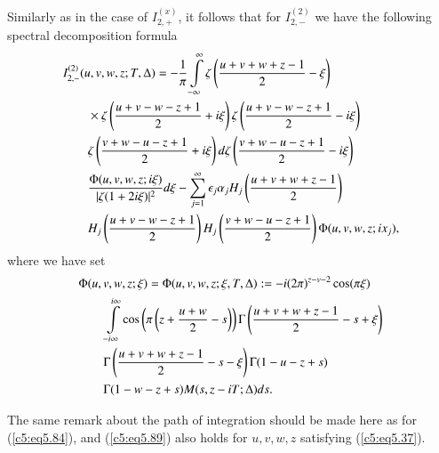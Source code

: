 Similarly as in the case of $I^{(x)}_{2,+}$, it follows that for
$I^{(2)}_{2,-}$ we have the following spectral decomposition formula 
\begin{align} 
& I^{(2)}_{2,-} (u,v,w,z;T,\Delta) = - \frac{1}{\pi}
  \int\limits^{\infty}_{-\infty} \zeta\left(\frac{u+v+w+z-1}{2}  - \xi
  \right)\label{c5:eq5.88}\\ 
& \qquad \times \zeta \left(\frac{u+v-w-z+1}{2} + i \xi \right) \zeta
  \left(\frac{u+v-w-z+1}{2} - i \xi \right)\notag\\ 
& \qquad  \zeta \left(\frac{v+w-u-z+1}{2} + i \xi \right) 
d \zeta \left(\frac{v+w-u-z+1}{2} - i \xi \right)\notag\\
& \qquad  \frac{\Phi(u,v,w,z;i\xi)}{|\zeta (1+2i\xi)|^2} d\xi 
 - \sum\limits^\infty_{j=1} \epsilon_j \alpha_j H_j
 \left(\frac{u+v+w+z-1}{2} \right)\notag\\ 
& \qquad H_j  \left(\frac{u+v-w-z+1}{2} \right) H_j
 \left(\frac{v+w-u-z+1}{2} \right) \Phi (u,v,w,z;i x_j),\notag 
\end{align}
where we have set
\begin{align}
& \Phi (u,v,w,z;\xi)  = \Phi (u,v,w,z;\xi, T, \Delta) : =  -i (2
  \pi)^{z - v -2} \cos (\pi \xi)\label{c5:eq5.89}\\ 
& \qquad \int\limits^{i\infty}_{-i\infty} \cos \left(\pi \left(z+
  \frac{u+w}{2} -s \right) \right) \Gamma \left(\frac{u+v+w+z-1}{2}  -
  s + \xi\right)\notag\\ 
& \qquad  \Gamma  \left(\frac{u+v+w+z-1}{2} -s - \xi\right) \Gamma
  (1-u - z + s)\notag\\ 
& \qquad \Gamma (1-w-z+ s) M (s, z - iT;\Delta) ds. \notag
\end{align}

The same remark about the path of integration should be made here as
for (\ref{c5:eq5.84}), and (\ref{c5:eq5.89}) also holds for $u,v,w,z$
satisfying (\ref{c5:eq5.37}). 

